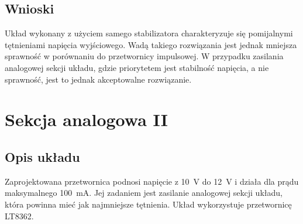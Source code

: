 \documentclass[11pt]{article}
\begin{document}
\subsection{Wnioski}
Układ wykonany z użyciem samego stabilizatora charakteryzuje się pomijalnymi tętnieniami napięcia wyjściowego. Wadą takiego rozwiązania jest jednak mniejsza sprawność w porównaniu do przetwornicy impulsowej. W przypadku zasilania analogowej sekcji układu, gdzie priorytetem jest stabilność napięcia, a nie sprawność, jest to jednak akceptowalne rozwiązanie.

\section{Sekcja analogowa II}
\subsection{Opis układu}
Zaprojektowana przetwornica podnosi napięcie z \SI{10}{\V} do \SI{12}{\V} i działa dla prądu maksymalnego \SI{100}{\milli\A}. Jej zadaniem jest zasilanie analogowej sekcji układu, która powinna mieć jak najmniejsze tętnienia. Układ wykorzystuje przetwornicę LT8362.
\end{document}
